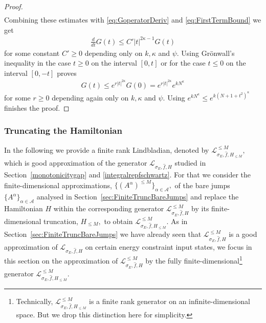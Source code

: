 \documentclass[11pt]{amsart}
\newcommand{\1}{\mathbbm{1}}
\newcommand{\cA}{\mathcal{A}}
\theoremstyle{plain}
\theoremstyle{definition}
\theoremstyle{remark}
\numberwithin{equation}{section}
\begin{document}
\begin{proof}
\begin{align*}
 \end{align*}
 Combining these estimates with \eqref{eq:GoperatorDeriv} and \eqref{eq:FirstTermBound} we get
 \begin{align*}
     \frac{d}{dt} G(t) \le C'|t|^{2\kappa-1} G(t) 
 \end{align*}
 for some constant $C'\ge 0$ depending only on $k,\kappa$ and $\psi.$ Using Gr\"onwall's inequality in the case $t\ge0$ on the interval $[0,t]$ or for the case $t\le 0$ on the interval $[0,-t]$ proves 
 \begin{align*}
     G(t) \le e^{r |t|^{2\kappa}} G(0) = e^{r |t|^{2\kappa}} e^{kN^\kappa}
 \end{align*}
 for some $r\ge 0$ depending again only on $k,\kappa$ and $\psi.$  Using $e^{kN^{\kappa}} \le e^{k(N+1+t^2)^{\kappa}}$ 
 finishes the proof.
\end{proof}










\subsubsection{Truncating the Hamiltonian}
\label{sec:FinitDimGenerator}

In the following we provide a finite rank Lindbladian, denoted by $\mathcal{L}^{\le M}_{\sigma_E,\widehat{f},H_{\le M}},$ which is good approximation of the generator $\mathcal{L}_{\sigma_E,\widehat{f},H}$ studied in Section~\ref{monotonicitygap} and \ref{integralrepfschwartz}. For that we consider the finite-dimensional approximations, $\{(A^{\alpha})^{\le M}\}_{\alpha\in\cA},$ of the bare jumps $\{A^\alpha\}_{\alpha\in\cA}$ analysed in Section~\ref{sec:FiniteTruncBareJumps} and replace the Hamiltonian $H$ within the corresponding generator $\mathcal{L}^{\le M}_{\sigma_E,\widehat{f},H}$ by its finite-dimensional truncation, $H_{\le M},$ to obtain $\mathcal{L}^{\le M}_{\sigma_E,\widehat{f},H_{\le M}}.$ As in Section~\ref{sec:FiniteTruncBareJumps} we have already seen that $\mathcal{L}^{\le M}_{\sigma_E,\widehat{f},H}$ is a good approximation of $\mathcal{L}_{\sigma_E,\widehat{f},H}$ on certain energy constraint input states, we focus in this section on the approximation of $\mathcal{L}^{\le M}_{\sigma_E,\widehat{f},H}$ by the fully finite-dimensional\footnote{Technically, $\mathcal{L}^{\le M}_{\sigma_E,\widehat{f},H_{\le M}}$ is a finite rank generator on an infinite-dimensional space. But we drop this distinction here for simplicity.} generator $\mathcal{L}^{\le M}_{\sigma_E,\widehat{f},H_{\le M}}.$
\end{document}
